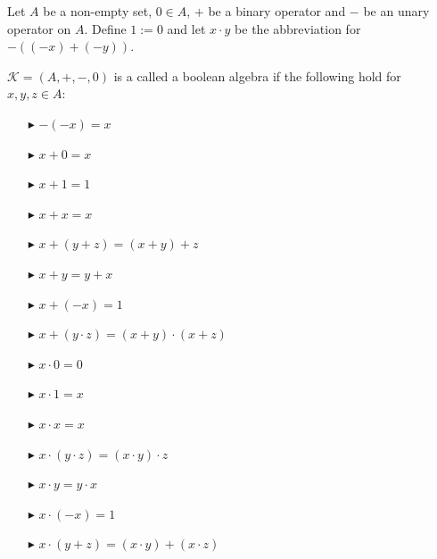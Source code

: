 \documentclass[10pt]{beamer}
\theoremstyle{definition}
\theoremstyle{definition}
\begin{document}
\begin{frame}\label{frame: boolean algebra}

\begin{definition}\label{defn: boolean algebra}
Let $A$ be a non-empty set, $0 \in A$, $+$ be a binary operator and $-$ be an unary operator
on $A$. Define $1 := 0$ and let $x\cdot y$ be the abbreviation for $-((-x)+(-y))$.\smallskip

$\mathcal{K} = (A,+,-,0)$ is a called a boolean algebra if the following hold
for $x, y, z \in A$:
\begin{multicols}{2}
\begin{enumerate}
\item[$\blacktriangleright$] $-(-x) = x$
\item[$\blacktriangleright$] $x + 0 = x$
\item[$\blacktriangleright$] $x + 1 = 1$
\item[$\blacktriangleright$] $x + x = x$
\item[$\blacktriangleright$] $x + (y + z) = (x + y) + z$
\item[$\blacktriangleright$] $x + y = y + x$
\item[$\blacktriangleright$] $x + (-x) = 1$
\item[$\blacktriangleright$] $x + (y\cdot z) = (x + y) \cdot (x + z)$
\item[]
\item[$\blacktriangleright$] $x \cdot 0 = 0$
\item[$\blacktriangleright$] $x \cdot 1 = x$
\item[$\blacktriangleright$] $x \cdot x = x$
\item[$\blacktriangleright$] $x \cdot (y \cdot z) = (x \cdot y) \cdot z$
\item[$\blacktriangleright$] $x \cdot y = y \cdot x$
\item[$\blacktriangleright$] $x \cdot (-x) = 1$
\item[$\blacktriangleright$] $x \cdot (y + z) = (x \cdot y) + (x \cdot z)$
\end{enumerate}
\end{multicols}
\end{definition}
\end{frame}

\end{document}
